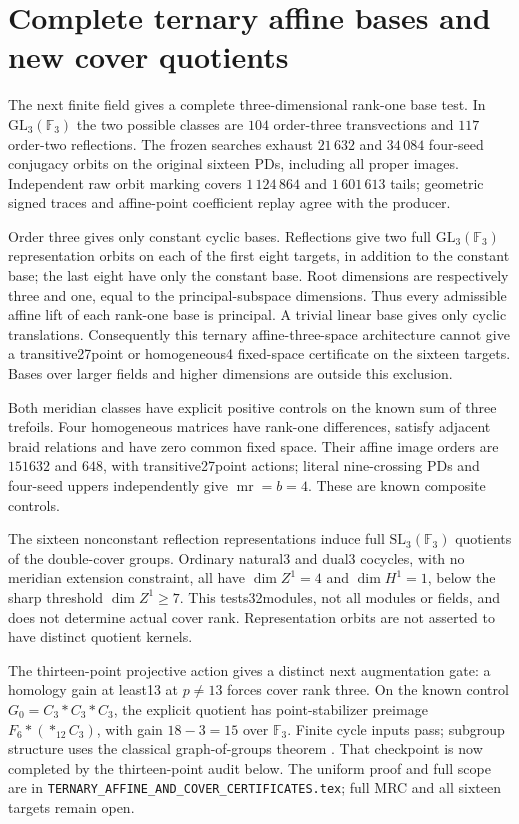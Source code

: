 \documentclass[11pt]{article}
\newcommand{\mr}{\operatorname{mr}}
\begin{document}
\section{Complete ternary affine bases and new cover quotients}

The next finite field gives a complete three-dimensional
rank-one base test. In $\mathrm{GL}_3(\mathbb F_3)$ the two
possible classes are $104$ order-three transvections and
$117$ order-two reflections. The frozen searches exhaust
$21\,632$ and $34\,084$ four-seed conjugacy orbits on the
original sixteen PDs, including all proper images.
Independent raw orbit marking covers $1\,124\,864$ and
$1\,601\,613$ tails; geometric signed traces and affine-point
coefficient replay agree with the producer.

Order three gives only constant cyclic bases. Reflections
give two full $\mathrm{GL}_3(\mathbb F_3)$ representation
orbits on each of the first eight targets, in addition to
the constant base; the last eight have only the constant
base. Root dimensions are respectively three and one, equal
to the principal-subspace dimensions. Thus every admissible
affine lift of each rank-one base is principal. A trivial
linear base gives only cyclic translations. Consequently
this ternary affine-three-space architecture cannot give a
transitive27point or homogeneous4 fixed-space certificate
on the sixteen targets. Bases over larger fields and higher
dimensions are outside this exclusion.

Both meridian classes have explicit positive controls on
the known sum of three trefoils. Four homogeneous matrices
have rank-one differences, satisfy adjacent braid relations
and have zero common fixed space. Their affine image orders
are $151632$ and $648$, with transitive27point actions;
literal nine-crossing PDs and four-seed uppers independently
give $\mr=b=4$. These are known composite controls.

The sixteen nonconstant reflection representations induce
full $\mathrm{SL}_3(\mathbb F_3)$ quotients of the double-cover
groups. Ordinary natural3 and dual3 cocycles, with no
meridian extension constraint, all have $\dim Z^1=4$ and
$\dim H^1=1$, below the sharp threshold $\dim Z^1\ge7$.
This tests32modules, not all modules or fields, and does not
determine actual cover rank. Representation orbits are not
asserted to have distinct quotient kernels.

The thirteen-point projective action gives a distinct next
augmentation gate: a homology gain at least13 at $p\ne13$
forces cover rank three. On the known control
$G_0=C_3*C_3*C_3$, the explicit quotient has point-stabilizer
preimage $F_6*(*_{12}C_3)$, with gain $18-3=15$ over
$\mathbb F_3$. Finite cycle inputs pass; subgroup structure
uses the classical graph-of-groups theorem \cite{serre}.
That checkpoint is now completed by the thirteen-point audit
below. The
uniform proof and full scope are in
\texttt{TERNARY\_AFFINE\_AND\_COVER\_CERTIFICATES.tex};
full MRC and all sixteen targets remain open.
\end{document}
